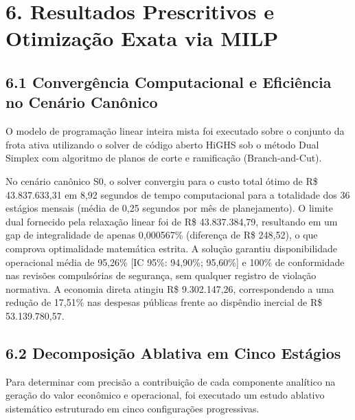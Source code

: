 \documentclass[10pt,a4paper,journal]{article}
\begin{document}
\section{6. Resultados Prescritivos e Otimização Exata via MILP}
\subsection{6.1 Convergência Computacional e Eficiência no Cenário Canônico}
O modelo de programação linear inteira mista foi executado sobre o conjunto da frota ativa utilizando o solver de código aberto HiGHS sob o método Dual Simplex com algoritmo de planos de corte e ramificação (Branch-and-Cut).

No cenário canônico S0, o solver convergiu para o custo total ótimo de R\$ 43.837.633,31 em 8,92 segundos de tempo computacional para a totalidade dos 36 estágios mensais (média de 0,25 segundos por mês de planejamento). O limite dual fornecido pela relaxação linear foi de R\$ 43.837.384,79, resultando em um gap de integralidade de apenas 0,000567\% (diferença de R\$ 248,52), o que comprova optimalidade matemática estrita. A solução garantiu disponibilidade operacional média de 95,26\% [IC 95\%: 94,90\%; 95,60\%] e 100\% de conformidade nas revisões compulsórias de segurança, sem qualquer registro de violação normativa. A economia direta atingiu R\$ 9.302.147,26, correspondendo a uma redução de 17,51\% nas despesas públicas frente ao dispêndio inercial de R\$ 53.139.780,57.

\subsection{6.2 Decomposição Ablativa em Cinco Estágios}
Para determinar com precisão a contribuição de cada componente analítico na geração do valor econômico e operacional, foi executado um estudo ablativo sistemático estruturado em cinco configurações progressivas.
\end{document}
